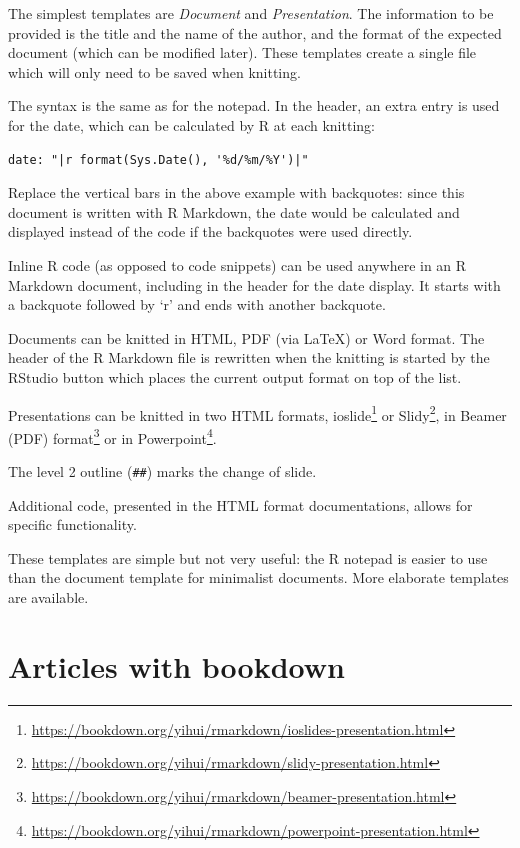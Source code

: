 \documentclass[
  12pt,
  american,
  a4paper,
  extrafontsizes,onecolumn,openright
  ]{memoir}
\begin{document}
\normalsize

The simplest templates are \emph{Document} and \emph{Presentation}.
The information to be provided is the title and the name of the author, and the format of the expected document (which can be modified later).
These templates create a single file which will only need to be saved when knitting.

The syntax is the same as for the notepad.
In the header, an extra entry is used for the date, which can be calculated by R at each knitting:

\begin{verbatim}
date: "|r format(Sys.Date(), '%d/%m/%Y')|"
\end{verbatim}

Replace the vertical bars \texttt{\textbar{}} in the above example with backquotes: since this document is written with R Markdown, the date would be calculated and displayed instead of the code if the backquotes were used directly.

Inline R code (as opposed to code snippets) can be used anywhere in an R Markdown document, including in the header for the date display.
It starts with a backquote followed by `r' and ends with another backquote.

Documents can be knitted in HTML, PDF (via LaTeX) or Word format.
The header of the R Markdown file is rewritten when the knitting is started by the RStudio button which places the current output format on top of the list.

Presentations can be knitted in two HTML formats, ioslide\footnote{\url{https://bookdown.org/yihui/rmarkdown/ioslides-presentation.html}} or Slidy\footnote{\url{https://bookdown.org/yihui/rmarkdown/slidy-presentation.html}}, in Beamer (PDF) format\footnote{\url{https://bookdown.org/yihui/rmarkdown/beamer-presentation.html}} or in Powerpoint\footnote{\url{https://bookdown.org/yihui/rmarkdown/powerpoint-presentation.html}}.

The level 2 outline (\texttt{\#\#}) marks the change of slide.

Additional code, presented in the HTML format documentations, allows for specific functionality.

These templates are simple but not very useful: the R notepad is easier to use than the document template for minimalist documents.
More elaborate templates are available.

\hypertarget{articles-with-bookdown}{%
\section{Articles with bookdown}\label{articles-with-bookdown}}
\end{document}
